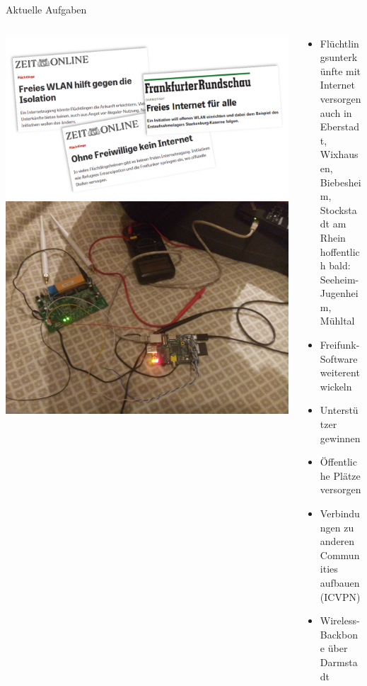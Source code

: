\documentclass[10pt]{beamer}
\begin{document}
    \begin{frame}{Aktuelle Aufgaben}
      \begin{columns}[T]
        \begin{column}{5cm}
          \includegraphics[width=\textwidth]{images/2015-10_presse-fluechtlinge}
          \vspace{1em}
          \includegraphics[width=\textwidth]{images/disassemble}
        \end{column}
        \begin{column}{7cm}
        \begin{itemize}[<+->]
          \item \large Flüchtlingsunterkünfte mit Internet versorgen\\
            \tiny auch in Eberstadt, Wixhausen, Biebesheim, Stockstadt am Rhein\\
            \tiny hoffentlich bald: Seeheim-Jugenheim, Mühltal
          \item Freifunk-Software weiterentwickeln
          \item Unterstützer gewinnen
          \item Öffentliche Plätze versorgen
          \item Verbindungen zu anderen Communities aufbauen (ICVPN)
          \item Wireless-Backbone über Darmstadt
        \end{itemize}
        \end{column}
      \end{columns}


\end{frame}
\end{document}
